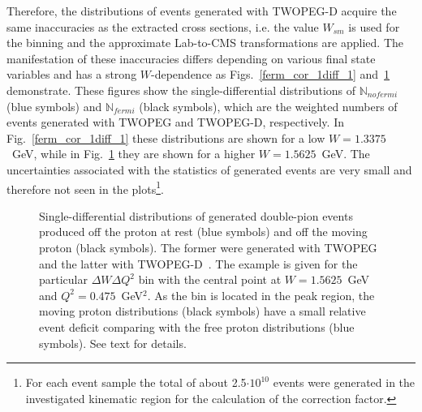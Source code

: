 Therefore, the distributions of events generated with TWOPEG-D acquire the same inaccuracies as the extracted cross sections, i.e. the value $W_{sm}$ is used for the binning and the approximate Lab-to-CMS transformations are applied. The manifestation of these inaccuracies differs depending on various final state variables and has a strong $W$-dependence as Figs.~\ref{ferm_cor_1diff_1} and~\ref{ferm_cor_1diff_2} demonstrate. These figures show the single-differential distributions of $\mathbb{N}_{nofermi}$ (blue symbols) and $\mathbb{N}_{fermi}$ (black symbols), which are the weighted numbers of events generated with TWOPEG and TWOPEG-D, respectively. In Fig.~\ref{ferm_cor_1diff_1} these distributions are shown for a low $W = 1.3375$~GeV, while in Fig.~\ref{ferm_cor_1diff_2} they are shown for a higher $W=1.5625$~GeV. The uncertainties associated with the statistics of generated events are very small and therefore not seen in the plots\footnote[4]{For each event sample the total of about 2.5$\cdot 10^{10}$ events were generated in the investigated kinematic region for the calculation of the correction factor.}.

\begin{figure}[htp]
\begin{center}
\caption{\small Single-differential distributions of generated double-pion events produced off the proton at rest (blue symbols) and off the moving proton (black symbols). The former were generated with TWOPEG~\cite{twopeg} and the latter with TWOPEG-D~\cite{twopeg-d}. The example is given for the particular $\Delta W \Delta Q^{2}$ bin with the central point at $W=1.5625$~GeV and $Q^{2}=0.475$~GeV$^{2}$. As the bin is located in the peak region, the moving proton distributions (black symbols) have a small relative event deficit comparing with the free proton distributions (blue symbols). See text for details. } \label{ferm_cor_1diff_2}
\end{center}
\end{figure}

